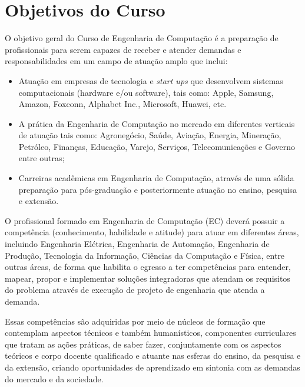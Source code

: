 \section{Objetivos do Curso}
\label{sec:objetivos}

O objetivo geral do Curso de Engenharia de Computação é a preparação de profissionais para serem capazes de receber e atender demandas e responsabilidades em um campo de atuação amplo que inclui:
\begin{itemize}
    \item Atuação em empresas de tecnologia e \textit{start ups} que desenvolvem sistemas computacionais (hardware e/ou software), tais como: Apple, Samsung, Amazon, Foxconn, Alphabet Inc., Microsoft, Huawei, etc.
    \item A prática da Engenharia de Computação no mercado em diferentes verticais de atuação tais como: Agronegócio, Saúde, Aviação, Energia, Mineração, Petróleo, Finanças, Educação, Varejo, Serviços, Telecomunicações e Governo entre outras;
    \item Carreiras acadêmicas em Engenharia de Computação, através de uma sólida preparação para pós-graduação e posteriormente atuação no ensino, pesquisa e extensão.
\end{itemize}

O profissional formado em Engenharia de Computação (EC) deverá possuir a competência (conhecimento, habilidade e atitude) para atuar em diferentes áreas, incluindo Engenharia Elétrica, Engenharia de Automação, Engenharia de Produção, Tecnologia da Informação, Ciências da Computação e Física, entre outras áreas, de forma que habilita o egresso a ter competências para entender, mapear, propor e implementar soluções integradoras que atendam os requisitos do problema através de execução de projeto de engenharia que atenda a demanda.

Essas competências são adquiridas por meio de núcleos de formação que contemplam aspectos técnicos e também humanísticos, componentes curriculares que tratam as ações práticas, de saber fazer, conjuntamente com os aspectos teóricos e corpo docente qualificado e atuante nas esferas do ensino, da pesquisa e da extensão, criando oportunidades de aprendizado em sintonia com as demandas do mercado e da sociedade.


